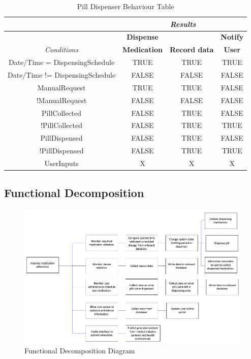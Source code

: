 \documentclass[12pt,titlepage]{article}
\begin{document}
\begin{table}[ht!]
\begin{center}
\begin{adjustbox}{max width=\textwidth}
\small
\begin{tabular}{| c | c | c | c |}
\hline
  & \multicolumn{3}{c|}{\textit{Results}}\\
 \hline 
  & \textbf{Dispense} & \textbf{} & \textbf{Notify}\\
 \textit{Conditions} & \textbf{Medication} & \textbf{Record data} & \textbf{User}\\
 \hline 
 Date/Time = DispensingSchedule & TRUE & TRUE & TRUE\\
 \hline
  Date/Time != DispensingSchedule & FALSE & FALSE & FALSE\\
 \hline
  ManualRequest & TRUE & TRUE & FALSE\\
 \hline
  !ManualRequest & FALSE & FALSE & FALSE\\
  \hline
   PillCollected & FALSE & TRUE & FALSE\\
 \hline
  !PillCollected & FALSE & TRUE & TRUE\\
 \hline
 PillDispensed & FALSE & TRUE & FALSE\\
 \hline
 !PillDispensed & FALSE & TRUE & TRUE\\
 \hline
  UserInputs & X & X & X\\
 \hline
\end{tabular}
\end{adjustbox}
\end{center}
\caption{Pill Dispenser Behaviour Table}
\end{table}

\pagebreak
\subsection{Functional Decomposition}
\begin{figure}[!htbp]
    \centering
    \includegraphics[width=\textwidth,height=\textheight,keepaspectratio]{FuncDecomp.png}
    \caption{Functional Decomposition Diagram}
    \label{fig:my_label}
\end{figure}
\end{document}
